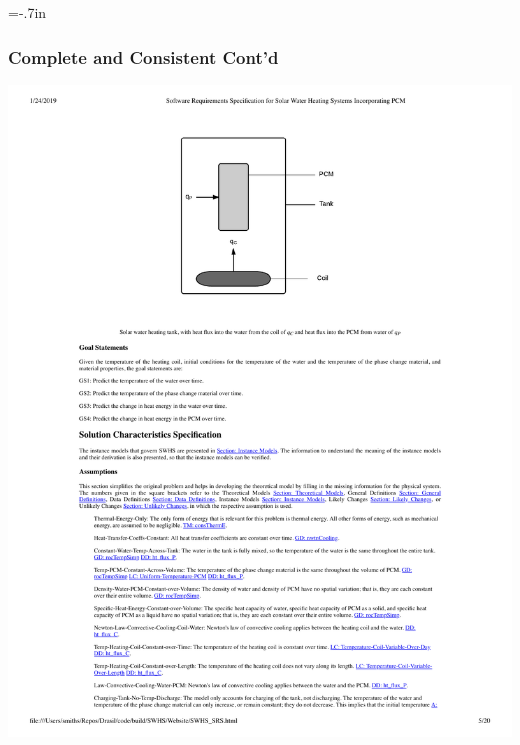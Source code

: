 \documentclass{beamer}
\begin{document}
\hoffset=-.7in 
\begin{frame}
\frametitle{Complete and Consistent Cont'd}
\includegraphics[width=1.2\textwidth]{Assumptions.pdf}
\end{frame}
\hoffset=0in

\end{document}
